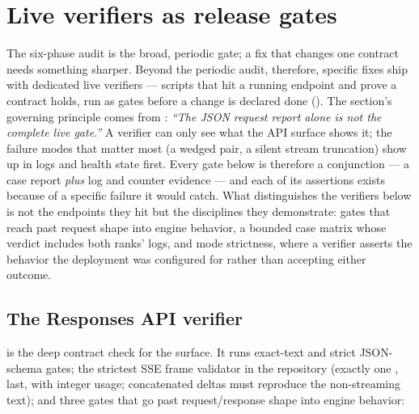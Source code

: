 \section{Live verifiers as release gates}

The six-phase audit is the broad, periodic gate; a fix that changes one
contract needs something sharper. Beyond the periodic audit, therefore,
specific fixes ship with dedicated live
verifiers --- scripts that hit a running endpoint and prove a contract
holds, run as gates before a change is declared done
(). The section's governing principle comes from
: \emph{``The JSON request report alone is not
the complete live gate.''} A verifier can only see what the API surface
shows it; the failure modes that matter most (a wedged pair, a silent
stream truncation) show up in logs and health state first. Every gate below
is therefore a conjunction --- a case report \emph{plus} log and counter
evidence --- and each of its assertions exists because of a specific
failure it would catch. What distinguishes the verifiers below is not the
endpoints they hit but the disciplines they demonstrate: gates that reach
past request shape into engine behavior, a bounded case matrix whose verdict
includes both ranks' logs, and mode strictness, where a verifier asserts the
behavior the deployment was configured for rather than accepting either
outcome.

\subsection{The Responses API verifier}

 is the deep contract check
for the  surface. It runs exact-text and strict
JSON-schema gates; the strictest SSE frame validator in the repository (exactly
one , last, with integer usage; concatenated
deltas must reproduce the non-streaming text); and three gates that go past
request/response shape into engine behavior:


